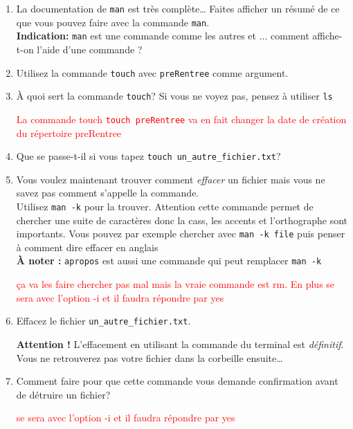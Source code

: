 \documentclass{article}
\begin{document}
\begin{exercice}

\begin{enumerate}
\def\labelenumi{\arabic{enumi}.}
\item
  La documentation de \texttt{man} est très complète\ldots{} Faites afficher un résumé
  de ce que vous pouvez faire avec la commande \texttt{man}.\\
  \textbf{Indication: }\texttt{man} est une commande comme les autres et ... comment affiche-t-on l'aide d'une commande ?
\item
  Utilisez la commande \texttt{touch} avec \texttt{preRentree} comme argument.
\item
  À quoi sert la commande \texttt{touch}? Si vous ne voyez pas, pensez à
  utiliser \texttt{ls}
\begin{correction}
  \textcolor{red}{La commande touch \texttt{touch preRentree} va en fait changer la date de création du répertoire preRentree}
\end{correction}

\item
  Que se passe-t-il si vous tapez \texttt{touch\ un\_autre\_fichier.txt}?
\item
  Vous voulez maintenant trouver comment \emph{effacer} un fichier mais
  vous ne savez pas comment s'appelle la commande. \\
  Utilisez \texttt{man\ -k} pour la trouver. Attention cette commande permet de chercher
  une suite de caractères donc la cass, les accents et l'orthographe
  sont importants.
  Vous pouvez par exemple chercher  avec \texttt{man -k file} puis penser à comment dire effacer en anglais \\
  \textbf{À noter : }\texttt{apropos} est aussi une commande qui peut remplacer \texttt{man -k}

\begin{correction}
\textcolor{red}{\c ca va les faire chercher pas mal mais la vraie commande est rm.
En plus se sera avec l'option -i et il faudra répondre par yes}
\end{correction}

\item
  Effacez le fichier \texttt{un\_autre\_fichier.txt}.

  \textbf{Attention !} L'effacement en utilisant la commande du terminal
  est \emph{définitif}. Vous ne retrouverez pas votre fichier dans la
  corbeille ensuite\ldots{}
\item
  Comment faire pour que cette commande vous demande confirmation avant
  de détruire un fichier?
\begin{correction}
\textcolor{red}{ se sera avec l'option -i et il faudra répondre par yes}
\end{correction}
\end{enumerate}

\end{exercice}
\end{document}
